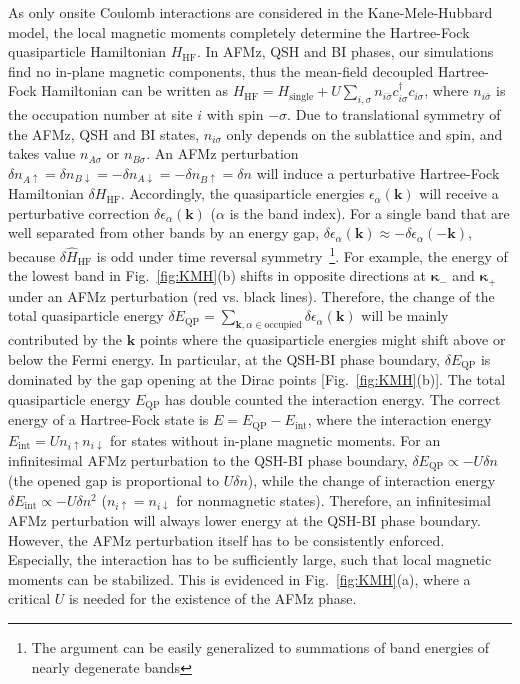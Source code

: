 \documentclass[twocolumn,aps,prl,superscriptaddress]{revtex4-2}
\begin{document}
As only onsite Coulomb interactions are considered in the Kane-Mele-Hubbard model, the local magnetic moments completely determine the Hartree-Fock quasiparticle Hamiltonian $H_{\mathrm{HF}}$. In AFMz, QSH and BI phases, our simulations find no in-plane magnetic components, thus the mean-field decoupled Hartree-Fock Hamiltonian can be written as $H_{\mathrm{HF}} = H_{\mathrm{single}} + U \sum_{i,\sigma} n_{i \bar{\sigma}} c^\dagger_{i\sigma} c_{i\sigma}$, where $n_{i\bar{\sigma}}$ is the occupation number at site $i$ with spin $-\sigma$. Due to translational symmetry of the AFMz, QSH and BI states, $n_{i\sigma}$ only depends on the sublattice and spin, and takes value $n_{A\sigma}$ or $n_{B\sigma}$. An AFMz perturbation $\delta n_{A\uparrow} = \delta n_{B\downarrow} = -\delta n_{A\downarrow} = -\delta n_{B\uparrow} = \delta n$ will induce a perturbative Hartree-Fock Hamiltonian $\delta H_{\mathrm{HF}}$. Accordingly, the quasiparticle energies $\epsilon_\alpha(\bm{k})$ will receive a perturbative correction $\delta \epsilon_\alpha(\bm{k})$ ($\alpha$ is the band index). For a single band that are well separated from other bands by an energy gap, $ \delta \epsilon_\alpha(\bm{k}) \approx - \delta \epsilon_\alpha(\bm{-k})$, because $\delta \hat{H}_{\mathrm{HF}}$ is odd under time reversal symmetry~\footnote{The argument can be easily generalized to summations of band energies of nearly degenerate bands}. For example, the energy of the lowest band in Fig.~\ref{fig:KMH}(b) shifts in opposite directions at $\bm{\kappa_-}$ and $\bm{\kappa_+}$ under an AFMz perturbation (red vs. black lines). Therefore, the change of the total quasiparticle energy $\delta E_\mathrm{QP} = \sum_{\bm{k},\alpha \in \mathrm{occupied}} \delta\epsilon_\alpha(\bm{k})$ will be mainly contributed by the $\bm{k}$ points where the quasiparticle energies might shift above or below the Fermi energy. In particular, at the QSH-BI phase boundary, $\delta E_\mathrm{QP}$ is dominated by the gap opening at the Dirac points [Fig.~\ref{fig:KMH}(b)]. The total quasiparticle energy $E_\mathrm{QP}$ has double counted the interaction energy. The correct energy of a Hartree-Fock state is $E = E_\mathrm{QP} - E_\mathrm{int}$, where the interaction energy $E_\mathrm{int} = U n_{i\uparrow} n_{i\downarrow}$ for states without in-plane magnetic moments. For an infinitesimal AFMz perturbation to the QSH-BI phase boundary, $\delta E_\mathrm{QP} \propto -U \delta n$ (the opened gap is proportional to $U \delta n$), while the change of interaction energy $\delta E_\mathrm{int} \propto  -U \delta n^2$ ($n_{i\uparrow} = n_{i\downarrow}$ for nonmagnetic states). Therefore, an infinitesimal AFMz perturbation will always lower energy at the QSH-BI phase boundary. However, the AFMz perturbation itself has to be consistently enforced. Especially, the interaction has to be sufficiently large, such that local magnetic moments can be stabilized. This is evidenced in Fig.~\ref{fig:KMH}(a), where a critical $U$ is needed for the existence of the AFMz phase.
\end{document}
